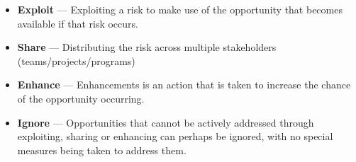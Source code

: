 \begin{itemize}
	\item \textbf{Exploit} ---
	Exploiting a risk to make use of the opportunity that becomes available if that risk occurs.

	\item \textbf{Share} ---
	Distributing the risk across multiple stakeholders (teams/projects/programs)

	\item \textbf{Enhance} ---
	Enhancements is an action that is taken to increase the chance of the opportunity occurring.

	\item \textbf{Ignore} ---
	Opportunities that cannot be actively addressed through exploiting, sharing or enhancing can perhaps be ignored, with no special measures being taken to address them.
\end{itemize}
